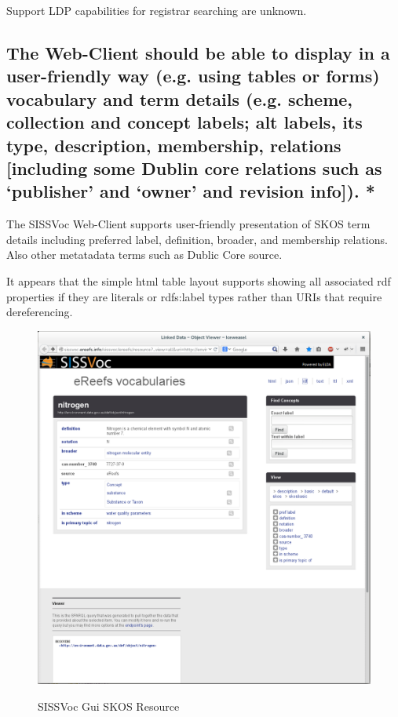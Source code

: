 \documentclass[10pt,a4paper]{article}
\begin{document}
\begin{flushleft}
Support LDP capabilities for registrar searching are unknown.


\subsection{ The Web-Client should be able to display in a user-friendly way
(e.g. using tables or forms) vocabulary and term details (e.g. scheme,
collection and concept labels; alt labels, its type, description, membership,
relations [including some Dublin core relations such as ‘publisher’ and ‘owner’
and revision info]). * }

The SISSVoc Web-Client supports user-friendly presentation of SKOS term details
including preferred label, definition, broader, and membership relations. Also
other metatadata terms such as Dublic Core source. 

It appears that the simple html table layout supports showing all associated rdf
properties if they are literals or rdfs:label types rather than URIs that
require dereferencing.

\begin{figure}[H]
\centering
\caption{SISSVoc Gui SKOS Resource }
\includegraphics[width=12cm]{nitrogen}  
\label{fig:test}
\end{figure}



\end{flushleft}
\end{document}
